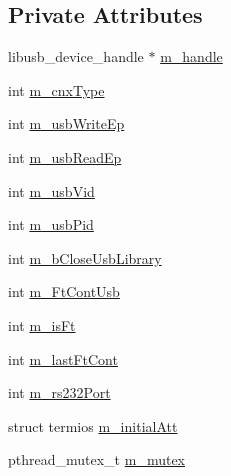 \subsection*{Private Attributes}
\begin{DoxyCompactItemize}
\item 
libusb\-\_\-device\-\_\-handle $\ast$ \hyperlink{classpolhemus_a0b6dd21dabb3c31007636ad25d4d12fe}{m\-\_\-handle}
\item 
int \hyperlink{classpolhemus_a3e2758afd02358a10b1b3fc670f2b4ac}{m\-\_\-cnx\-Type}
\item 
int \hyperlink{classpolhemus_aab4d88a8908c2433cdf0fc314dfff9f9}{m\-\_\-usb\-Write\-Ep}
\item 
int \hyperlink{classpolhemus_a6895d12a102d37b7585c064562187cf0}{m\-\_\-usb\-Read\-Ep}
\item 
int \hyperlink{classpolhemus_aeca35d88e697df6b3683a8426db177cb}{m\-\_\-usb\-Vid}
\item 
int \hyperlink{classpolhemus_ad02d412a6ae11c75f08694d9d57a18fc}{m\-\_\-usb\-Pid}
\item 
int \hyperlink{classpolhemus_abef43154f424514211a4ad8f310ace0e}{m\-\_\-b\-Close\-Usb\-Library}
\item 
int \hyperlink{classpolhemus_a481e90e59c2339e2ee06d7037ffd7e9d}{m\-\_\-\-Ft\-Cont\-Usb}
\item 
int \hyperlink{classpolhemus_a4a91c2a9c60b615ab09c351bc4f9c554}{m\-\_\-is\-Ft}
\item 
int \hyperlink{classpolhemus_ae3d34ad03f938f41bc19ec4b9bf87df9}{m\-\_\-last\-Ft\-Cont}
\item 
int \hyperlink{classpolhemus_a81be70563696aec3c266713f2f470fda}{m\-\_\-rs232\-Port}
\item 
struct termios \hyperlink{classpolhemus_aca06650b856d974eba8967d0a84e896c}{m\-\_\-initial\-Att}
\item 
pthread\-\_\-mutex\-\_\-t \hyperlink{classpolhemus_a2e28abafc19e312be55317a11bc42718}{m\-\_\-mutex}
\end{DoxyCompactItemize}


